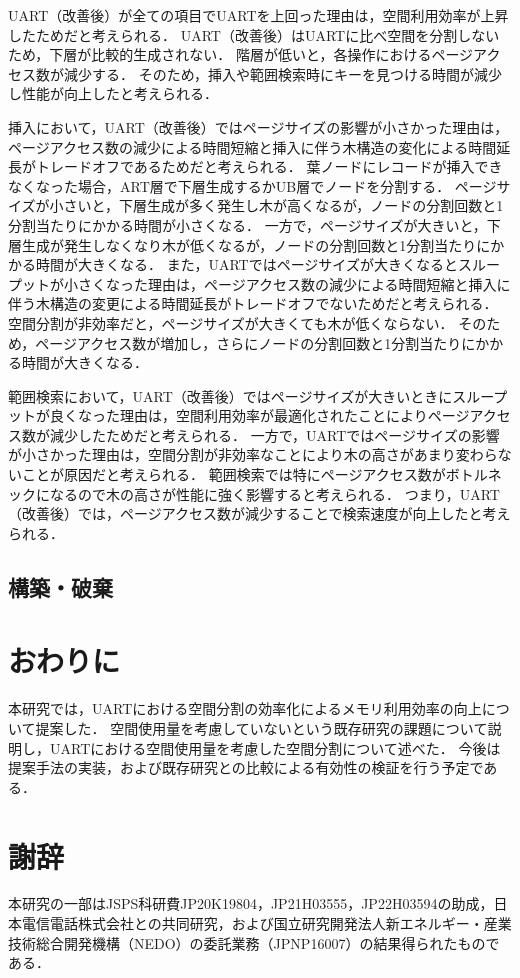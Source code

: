 UART（改善後）が全ての項目でUARTを上回った理由は，空間利用効率が上昇したためだと考えられる．
UART（改善後）はUARTに比べ空間を分割しないため，下層が比較的生成されない．
階層が低いと，各操作におけるページアクセス数が減少する．
そのため，挿入や範囲検索時にキーを見つける時間が減少し性能が向上したと考えられる．

挿入において，UART（改善後）ではページサイズの影響が小さかった理由は，ページアクセス数の減少による時間短縮と挿入に伴う木構造の変化による時間延長がトレードオフであるためだと考えられる．
葉ノードにレコードが挿入できなくなった場合，ART層で下層生成するかUB層でノードを分割する．
ページサイズが小さいと，下層生成が多く発生し木が高くなるが，ノードの分割回数と1分割当たりにかかる時間が小さくなる．
一方で，ページサイズが大きいと，下層生成が発生しなくなり木が低くなるが，ノードの分割回数と1分割当たりにかかる時間が大きくなる．
また，UARTではページサイズが大きくなるとスループットが小さくなった理由は，ページアクセス数の減少による時間短縮と挿入に伴う木構造の変更による時間延長がトレードオフでないためだと考えられる．
空間分割が非効率だと，ページサイズが大きくても木が低くならない．
そのため，ページアクセス数が増加し，さらにノードの分割回数と1分割当たりにかかる時間が大きくなる．

範囲検索において，UART（改善後）ではページサイズが大きいときにスループットが良くなった理由は，空間利用効率が最適化されたことによりページアクセス数が減少したためだと考えられる．
一方で，UARTではページサイズの影響が小さかった理由は，空間分割が非効率なことにより木の高さがあまり変わらないことが原因だと考えられる．
範囲検索では特にページアクセス数がボトルネックになるので木の高さが性能に強く影響すると考えられる．
つまり，UART（改善後）では，ページアクセス数が減少することで検索速度が向上したと考えられる．

\section{構築・破棄}



\chapter{おわりに}

本研究では，UARTにおける空間分割の効率化によるメモリ利用効率の向上について提案した．
空間使用量を考慮していないという既存研究の課題について説明し，UARTにおける空間使用量を考慮した空間分割について述べた．
今後は提案手法の実装，および既存研究との比較による有効性の検証を行う予定である．





\chapter*{謝辞}

本研究の一部はJSPS科研費JP20K19804，JP21H03555，JP22H03594の助成，日本電信電話株式会社との共同研究，および国立研究開発法人新エネルギー・産業技術総合開発機構（NEDO）の委託業務（JPNP16007）の結果得られたものである．